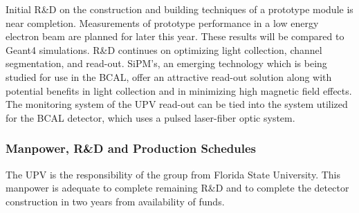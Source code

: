 Initial R\&D on the construction and building techniques of a prototype module 
is near completion. Measurements of prototype performance in a low energy 
electron beam are planned for later this year.  These results will be compared 
to Geant4 simulations.   R\&D continues on optimizing light collection, 
channel segmentation, and read-out. SiPM's, an emerging technology which is 
being studied for use in the BCAL, offer an attractive read-out solution 
along with potential benefits in light collection and in minimizing high 
magnetic field effects. The monitoring system of the UPV read-out can be 
tied into the system utilized for the BCAL detector, which uses a pulsed 
laser-fiber optic system.



\subsubsection*{Manpower, R\&D and Production Schedules}

The UPV is the responsibility of the group from Florida State University.  
This manpower is adequate to complete remaining R\&D and to complete the 
detector construction in two years from availability of funds.

